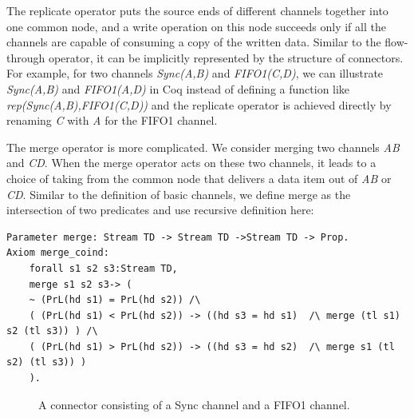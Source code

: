 \documentclass[preprint,3p]{elsarticle}
\begin{document}
The replicate operator puts the source ends of different channels together into one common node, and a write operation on this node succeeds only if all the channels are capable of consuming a copy of the written data. %
Similar to the flow-through operator, it can be implicitly represented by the structure of connectors. For example, for two channels \emph{Sync(A,B)} and \emph{FIFO1(C,D)}, we can illustrate \emph{Sync(A,B)} and \emph{FIFO1(A,D)} in Coq instead of defining a function like \emph{rep(Sync(A,B),FIFO1(C,D))} and the replicate operator is achieved directly by renaming \emph{C} with \emph{A} for the FIFO1 channel.

The merge operator is more complicated. We consider merging two
channels \emph{AB} and \emph{CD}. When the merge operator acts on
these two channels, it leads to a choice of taking from the common
node that delivers a data item out of \emph{AB} or \emph{CD}.
Similar to the definition of basic channels, we define merge as the intersection of two predicates and use recursive definition here:
\begin{lstlisting}[language=coq]
Parameter merge: Stream TD -> Stream TD ->Stream TD -> Prop.
Axiom merge_coind:
    forall s1 s2 s3:Stream TD,
    merge s1 s2 s3-> (
    ~ (PrL(hd s1) = PrL(hd s2)) /\
    ( (PrL(hd s1) < PrL(hd s2)) -> ((hd s3 = hd s1)  /\ merge (tl s1) s2 (tl s3)) ) /\
    ( (PrL(hd s1) > PrL(hd s2)) -> ((hd s3 = hd s2)  /\ merge s1 (tl s2) (tl s3)) )
    ).
\end{lstlisting}

\begin{figure}
\vspace{0cm}
\centering
{}
\caption{A connector consisting of a Sync channel and a FIFO1 channel.}\label{fig:compsyncfifo}
\end{figure}
\end{document}
